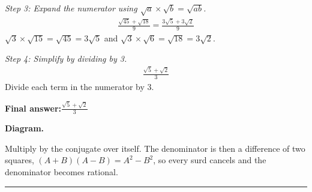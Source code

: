 \documentclass[11pt]{article}
\begin{document}
\textit{Step 3: Expand the numerator using \( \sqrt{a} \times \sqrt{b} = \sqrt{ab} \).}
\[\begin{gathered}
\frac{\sqrt{45} + \sqrt{18}}{9} = \frac{3\sqrt{5} + 3\sqrt{2}}{9}
\end{gathered}\]
\( \sqrt{3} \times \sqrt{15} = \sqrt{45} = 3\sqrt{5} \) and \( \sqrt{3} \times \sqrt{6} = \sqrt{18} = 3\sqrt{2} \).

\textit{Step 4: Simplify by dividing by 3.}
\[\begin{gathered}
\frac{\sqrt{5} + \sqrt{2}}{3}
\end{gathered}\]
Divide each term in the numerator by 3.

\begin{answerbox}
\textbf{Final answer:}\quad \(\displaystyle \frac{\sqrt{5} + \sqrt{2}}{3}\)
\end{answerbox}
\textbf{Diagram.}

\begin{center}
\end{center}
\small Multiply by the conjugate over itself. The denominator is then a difference of two squares, $(A+B)(A-B)=A^{2}-B^{2}$, so every surd cancels and the denominator becomes rational.\normalsize

\medskip\hrule
\end{document}

